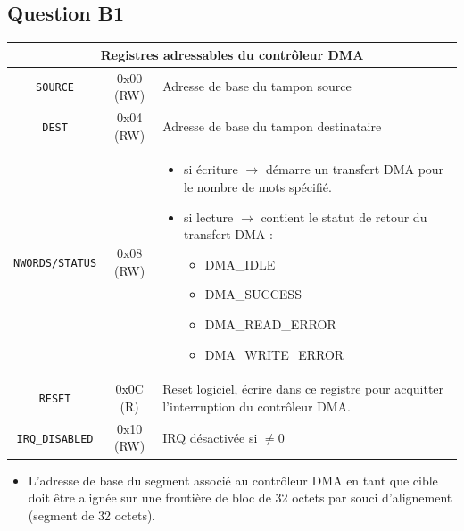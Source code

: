 \documentclass[10pt]{article}
\begin{document}
\subsection{Question B1}
\begin{tabular}{|c|c|p{5cm}|}
  \hline
  \multicolumn{3}{|c|}{Registres adressables du contrôleur DMA}\\ \hline
  \texttt{SOURCE} & 0x00 (RW) & Adresse de base du tampon source \\ \hline
  \texttt{DEST} & 0x04 (RW) & Adresse de base du tampon destinataire \\ \hline
  \texttt{NWORDS/STATUS} & 0x08 (RW) &  \begin{itemize}
                                          \item si écriture $\rightarrow$
                                          démarre un transfert DMA pour le
                                          nombre de mots spécifié.
                                          \item si lecture $\rightarrow$
                                          contient le statut de retour du
                                          transfert DMA :
                                          \begin{itemize}
                                            \item DMA\_IDLE
                                            \item DMA\_SUCCESS
                                            \item DMA\_READ\_ERROR
                                            \item DMA\_WRITE\_ERROR
                                          \end{itemize}
                                        \end{itemize} \\ \hline
  \texttt{RESET} & 0x0C (R) & Reset logiciel, écrire dans ce registre pour
                              acquitter l'interruption du contrôleur DMA. \\ \hline
  \texttt{IRQ\_DISABLED} & 0x10 (RW) & IRQ désactivée si $\neq0$ \\ \hline
\end{tabular}
\begin{itemize}
  \item L’adresse de base du segment associé au contrôleur DMA en tant que cible
  doit être alignée sur une frontière de bloc de 32 octets par souci
  d'alignement (segment de 32 octets).
\end{itemize}
\end{document}
